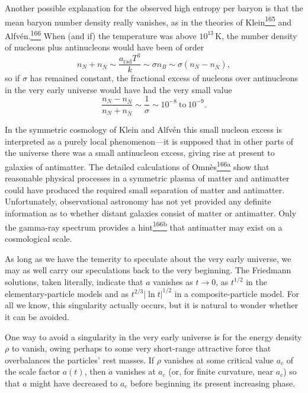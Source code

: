 Another possible explanation for the observed high entropy per baryon is that
the mean baryon number density really vanishes, as in the theories of
Klein\hyperref[ch15-ref-165]{\textsuperscript{165}} and
Alfv\'en.\hyperref[ch15-ref-166]{\textsuperscript{166}} When (and if) the
temperature was above \(10^{13}\,\mathrm K\), the number density of nucleons
plus antinucleons would have been of order
\[
  n_N+n_{\bar N}
  \sim
  \frac{a_{\mathrm{rad}}T^3}{k}
  \sim
  \sigma n_B
  \sim
  \sigma(n_N-n_{\bar N}),
\]
so if \(\sigma\) has remained constant, the fractional excess of nucleons
over antinucleons in the very early universe would have had the very small
value
\[
  \frac{n_N-n_{\bar N}}{n_N+n_{\bar N}}
  \sim
  \frac1\sigma
  \sim
  10^{-8}\ \text{to}\ 10^{-9}.
\]

In the symmetric cosmology of Klein and Alfv\'en this small nucleon excess is
interpreted as a purely local phenomenon---it is supposed that in other parts
of the universe there was a small antinucleon excess, giving rise at present to
galaxies of antimatter. The detailed calculations of
Omn\`es\hyperref[ch15-ref-166a]{\textsuperscript{166a}} show that reasonable
physical processes in a symmetric plasma of matter and antimatter could have
produced the required small separation of matter and antimatter. Unfortunately,
observational astronomy has not yet provided any definite information as to
whether distant galaxies consist of matter or antimatter. Only the gamma-ray
spectrum provides a hint\hyperref[ch15-ref-166b]{\textsuperscript{166b}} that
antimatter may exist on a cosmological scale.

As long as we have the temerity to speculate about the very early universe, we
may as well carry our speculations back to the very beginning. The Friedmann
solutions, taken literally, indicate that \(a\) vanishes as \(t\to0\), as
\(t^{1/2}\) in the elementary-particle models and as
\(t^{2/3}\lvert\ln t\rvert^{1/2}\) in a composite-particle model. For all we
know, this singularity actually occurs, but it is natural to wonder whether it
can be avoided.

One way to avoid a singularity in the very early universe is for the energy
density \(\rho\) to vanish, owing perhaps to some very short-range attractive
force that overbalances the particles' rest masses. If \(\rho\) vanishes at
some critical value \(a_c\) of the scale factor \(a(t)\), then \(\dot a\)
vanishes at \(a_c\) (or, for finite curvature, near \(a_c\)) so that \(a\)
might have decreased to \(a_c\) before beginning its present increasing
phase.

